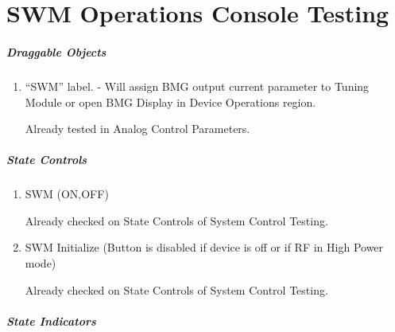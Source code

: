 \documentclass[11pt]{book}		%
\begin{document}
\color{black}






\chapter{SWM Operations Console Testing}

\paragraph{Draggable Objects}

\begin{enumerate}
 \item ``SWM'' label. - Will assign BMG output current parameter to Tuning Module or open BMG Display in Device Operations region.

\color{red}
Already tested in Analog Control Parameters.
\color{black}

\end{enumerate}

\paragraph{State Controls}

\begin{enumerate}
 \item SWM (ON,OFF)

\color{red}
Already checked on State Controls of System Control Testing.
\color{black}

 \item SWM Initialize (Button is disabled if device is off or if RF in High Power mode)

\color{red}
Already checked on State Controls of System Control Testing.
\color{black}

\end{enumerate}

\paragraph{State Indicators}
\end{document}
